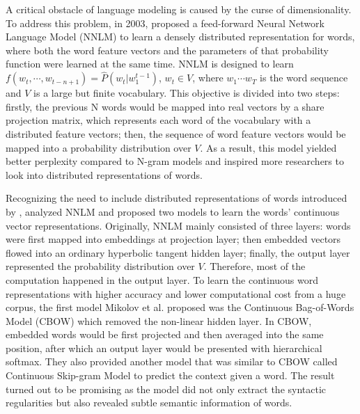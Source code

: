 \documentclass[12pt]{diazessay} %
\begin{document}
A critical obstacle of language modeling is caused by the curse of dimensionality. To address this problem, in 2003, \citet{bengio2003neural} proposed a feed-forward Neural Network Language Model (NNLM) to learn a densely distributed representation\citep{hinton1986learning} for words, where both the word feature vectors and the parameters of that probability function were learned at the same time. NNLM is designed to learn $f \left( w _ { t } , \cdots , w _ { t - n + 1 } \right) = \hat { P } \left( w _ { t } | w _ { 1 } ^ { t - 1 } \right)$, $w _ { t } \in V$, where $w_1 \cdots w_T$ is the word sequence and $V$ is a large but finite vocabulary. This objective is divided into two steps: firstly, the previous N words would be mapped into real vectors by a share projection matrix, which represents each word of the vocabulary with a distributed feature vectors; then, the sequence of word feature vectors would be mapped into a probability distribution over $V$. As a result, this model yielded better perplexity compared to N-gram models and inspired more researchers to look into distributed representations of words.

Recognizing the need to include distributed representations of words introduced by \citet{hinton1984distributed}, \citet{mikolov2013efficient} analyzed NNLM and proposed two models to learn the words' continuous vector representations. Originally, NNLM mainly consisted of three layers: words were first mapped into embeddings at projection layer; then embedded vectors flowed into an ordinary hyperbolic tangent hidden layer; finally, the output layer represented the probability distribution over $V$. Therefore, most of the computation happened in the output layer. To learn the continuous word representations with higher accuracy and lower computational cost from a huge corpus, the first model Mikolov et al. proposed was the Continuous Bag-of-Words Model (CBOW) which removed the non-linear hidden layer. In CBOW, embedded words would be first projected and then averaged into the same position, after which an output layer would be presented with hierarchical softmax. They also provided another model that was similar to CBOW called Continuous Skip-gram Model to predict the context given a word. The result turned out to be promising as the model did not only extract the syntactic regularities but also revealed subtle semantic information of words.
\end{document}
